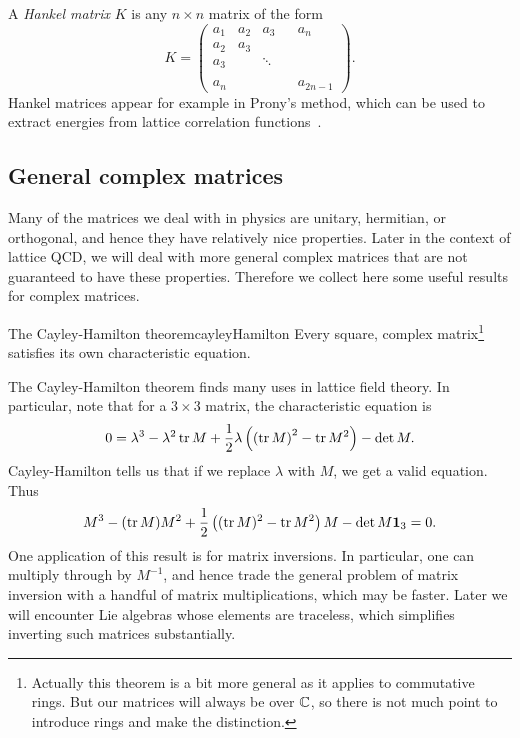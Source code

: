 A {\it Hankel matrix} $K$ is any $n\times n$ matrix of the form
\begin{equation}
K=\begin{pmatrix}
  a_1 & a_2 & a_3 &  & a_n  \\
  a_2 & a_3 &     &  & \\
  a_3 &     & \ddots &  &  \\ 
      &     &     &  &  \\
  a_n &     &     &  & a_{2n-1}
\end{pmatrix}.
\end{equation}
Hankel matrices appear for example in Prony's method, which can be used to
extract energies from lattice correlation functions~\cite{cushman_automated_2020}.

\subsection{General complex matrices}

Many of the matrices we deal with in physics are unitary, hermitian,
or orthogonal, and hence they have relatively nice properties.
Later in the context of lattice QCD, we will deal with more general
complex matrices that are not guaranteed to have these properties.
Therefore we collect here some useful results for complex matrices.

\begin{theorem}{The Cayley-Hamilton theorem}{cayleyHamilton}
Every square, complex matrix\footnote{Actually this theorem is
a bit more general as it applies to commutative rings.
But our matrices will always be over $\mathbb{C}$, so there is not
much point to introduce rings and make the distinction.} 
satisfies its own characteristic equation.
\end{theorem}

The Cayley-Hamilton theorem finds many uses in lattice field theory. In
particular, note that for a $3\times 3$ matrix, the characteristic equation is
\begin{equation}\label{eq:3x3characteristic}
0=\lambda^3-\lambda^2\tr
M+\frac{1}{2}\lambda\left(\left(\tr M\right)^2-\tr M^2\right)-\det M.
\end{equation}
Cayley-Hamilton tells us that if we replace $\lambda$ with $M$, we get a valid
equation. Thus
\begin{equation}\label{eq:inv3x3CH}
M^3-(\tr M) M^2+\frac{1}{2}\left((\tr M)^2-\tr M^2\right) M
-\det M  {\mathbf 1}_3=0.
\end{equation}
One application of this result is for matrix inversions. In particular,
one can multiply through by $M^{-1}$, and hence trade
the general problem of matrix inversion with a handful of matrix
multiplications, which may be faster.
Later we will encounter Lie algebras whose elements
are traceless, which simplifies inverting such
matrices substantially.

